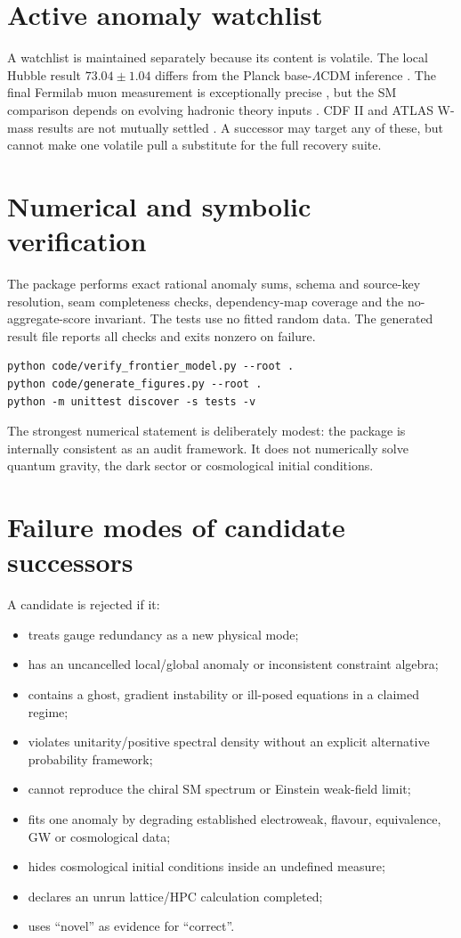 \documentclass[11pt,a4paper]{article}
\begin{document}
\section{Active anomaly watchlist}
A watchlist is maintained separately because its content is volatile. The local Hubble result $73.04\pm1.04$ differs from the Planck base-$\Lambda$CDM inference \cite{Riess2022,Planck2018}. The final Fermilab muon measurement is exceptionally precise \cite{MuonG2Final2026}, but the SM comparison depends on evolving hadronic theory inputs \cite{MuonG2Theory2025}. CDF II and ATLAS W-mass results are not mutually settled \cite{CDFW2022,ATLASW2024}. A successor may target any of these, but cannot make one volatile pull a substitute for the full recovery suite.

\section{Numerical and symbolic verification}
The package performs exact rational anomaly sums, schema and source-key resolution, seam completeness checks, dependency-map coverage and the no-aggregate-score invariant. The tests use no fitted random data. The generated result file reports all checks and exits nonzero on failure.

\begin{verbatim}
python code/verify_frontier_model.py --root .
python code/generate_figures.py --root .
python -m unittest discover -s tests -v
\end{verbatim}

The strongest numerical statement is deliberately modest: the package is internally consistent as an audit framework. It does not numerically solve quantum gravity, the dark sector or cosmological initial conditions.

\section{Failure modes of candidate successors}
A candidate is rejected if it:
\begin{itemize}
\item treats gauge redundancy as a new physical mode;
\item has an uncancelled local/global anomaly or inconsistent constraint algebra;
\item contains a ghost, gradient instability or ill-posed equations in a claimed regime;
\item violates unitarity/positive spectral density without an explicit alternative probability framework;
\item cannot reproduce the chiral SM spectrum or Einstein weak-field limit;
\item fits one anomaly by degrading established electroweak, flavour, equivalence, GW or cosmological data;
\item hides cosmological initial conditions inside an undefined measure;
\item declares an unrun lattice/HPC calculation completed;
\item uses ``novel'' as evidence for ``correct''.
\end{itemize}
\end{document}

